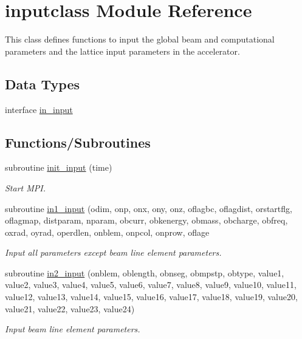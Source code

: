 \hypertarget{namespaceinputclass}{}\section{inputclass Module Reference}
\label{namespaceinputclass}


This class defines functions to input the global beam and computational parameters and the lattice input parameters in the accelerator.  


\subsection*{Data Types}
\begin{DoxyCompactItemize}
\item 
interface \mbox{\hyperlink{interfaceinputclass_1_1in__input}{in\+\_\+input}}
\end{DoxyCompactItemize}
\subsection*{Functions/\+Subroutines}
\begin{DoxyCompactItemize}
\item 
subroutine \mbox{\hyperlink{namespaceinputclass_ae7866a50f5576b1fea0aa1b10f98690b}{init\+\_\+input}} (time)
\begin{DoxyCompactList}\small\item\em Start M\+PI. \end{DoxyCompactList}\item 
subroutine \mbox{\hyperlink{namespaceinputclass_a907319f6e5d34930fbc63f5af426e9bd}{in1\+\_\+input}} (odim, onp, onx, ony, onz, oflagbc, oflagdist, orstartflg, oflagmap, distparam, nparam, obcurr, obkenergy, obmass, obcharge, obfreq, oxrad, oyrad, operdlen, onblem, onpcol, onprow, oflage
\begin{DoxyCompactList}\small\item\em Input all parameters except beam line element parameters. \end{DoxyCompactList}\item 
subroutine \mbox{\hyperlink{namespaceinputclass_af94bb0662dc4e95990a7b13c1110d831}{in2\+\_\+input}} (onblem, oblength, obnseg, obmpstp, obtype, value1, value2, value3, value4, value5, value6, value7, value8, value9, value10, value11, value12, value13, value14, value15, value16, value17, value18, value19, value20, value21, value22, value23, value24)
\begin{DoxyCompactList}\small\item\em Input beam line element parameters. \end{DoxyCompactList}\end{DoxyCompactItemize}


